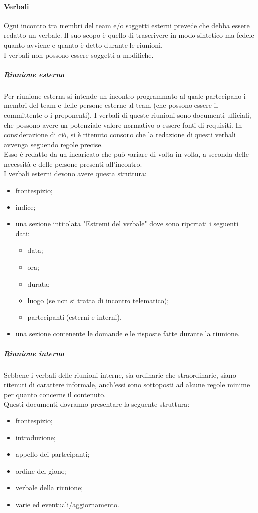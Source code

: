 			\paragraph{Verbali} \label{sec:verbali}
				Ogni incontro tra membri del team e/o soggetti esterni prevede che debba essere redatto un verbale. Il suo scopo è quello di trascrivere in modo sintetico ma fedele quanto avviene e quanto è detto durante le riunioni.\\
				I verbali non possono essere soggetti a modifiche.
				\subparagraph{Riunione esterna}
					Per riunione esterna si intende un incontro programmato al quale partecipano i membri del team e delle persone esterne al team (che possono essere il committente o i proponenti). I verbali di queste riunioni sono documenti ufficiali, che possono avere un potenziale valore normativo o essere fonti di requisiti. In considerazione di ciò, si è ritenuto consono che la redazione di questi verbali avvenga seguendo regole precise.\\
					Esso è redatto da un incaricato che può variare di volta in volta, a seconda delle necessità e delle persone presenti all’incontro.\\
					I verbali esterni devono avere questa struttura:
					\begin{itemize}
						\item frontespizio;
						\item indice;
						\item una sezione intitolata "Estremi del verbale" dove sono riportati i seguenti dati:
						\begin{itemize}
							\item data;
							\item ora;
							\item durata;
							\item luogo (se non si tratta di incontro telematico);
							\item partecipanti (esterni e interni).
						\end{itemize}
						\item una sezione contenente le domande e le risposte fatte durante la riunione.
					\end{itemize}
				\subparagraph{Riunione interna}
					Sebbene i verbali delle riunioni interne, sia ordinarie che straordinarie, siano ritenuti di carattere informale, anch'essi sono sottoposti ad alcune regole minime per quanto concerne il contenuto.  \\
					Questi documenti dovranno presentare la seguente struttura:
					\begin{itemize}
						\item frontespizio;
						\item introduzione;
						\item appello dei partecipanti;
						\item ordine del giono;
						\item verbale della riunione;
						\item varie ed eventuali/aggiornamento.
					\end{itemize}
